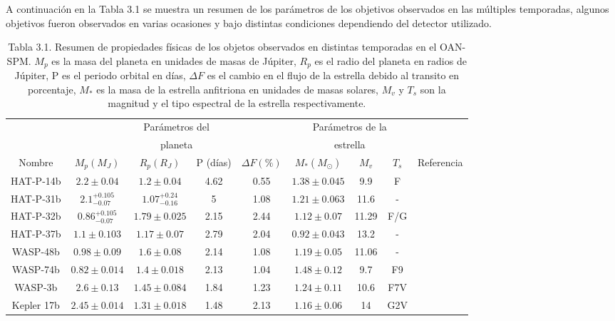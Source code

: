 A continuación en la Tabla 3.1 se muestra un resumen de los parámetros de los objetivos observados en las múltiples temporadas, algunos objetivos fueron observados en varias ocasiones y bajo distintas condiciones dependiendo del detector utilizado.



\begin{table}
\hspace{-1.7cm}
\begin{footnotesize}
\begin{tabular}{ccccccccc}
\hline 
 & \multicolumn{4}{c}{Parámetros del} & \multicolumn{3}{c}{Parámetros de la} &  \\
 & \multicolumn{4}{c}{planeta} & \multicolumn{3}{c}{estrella} & \\
\hline 
Nombre & $M_{p} (M_{J}) $ & $R_{p} (R_{J}) $ &  P (días) & $\Delta F (\%)$ & $M_{*} (M_{\odot})$ & $M_{v}$ & $T_{s}$ & Referencia \\ 
\hline 
HAT-P-14b & $2.2\pm 0.04 $ & $1.2\pm 0.04 $ & 4.62 & 0.55 & $1.38\pm 0.045$ & 9.9 & F & \cite{torres2010hat} \\ 
HAT-P-31b & $2.1^{+0.105}_{-0.07} $ & $1.07^{+0.24}_{-0.16} $ & 5 & 1.08 & $1.21\pm 0.063$ & 11.6 & - & \cite{kipping2011hat} \\
HAT-P-32b & $0.86^{+0.105}_{-0.07} $ & $1.79\pm 0.025 $ & 2.15 & 2.44 & $1.12\pm 0.07$ & 11.29 & F/G & \cite{hartman2011hat} \\  
HAT-P-37b & $1.1\pm 0.103 $ & $1.17\pm 0.07 $ & 2.79 & 2.04 & $0.92\pm 0.043$ & 13.2 & - & \cite{bakos2012hat} \\
WASP-48b & $0.98\pm 0.09 $ & $1.6\pm 0.08 $ & 2.14 & 1.08 & $1.19\pm 0.05$ & 11.06 & - & \cite{enoch2011wasp} \\
WASP-74b & $0.82\pm 0.014 $ & $1.4\pm 0.018 $ & 2.13 & 1.04 & $1.48\pm 0.12$ & 9.7 & F9 & \cite{hellier2015three} \\
WASP-3b & $2.6\pm 0.13 $ & $1.45\pm 0.084 $ & 1.84 & 1.23 & $1.24\pm 0.11$ & 10.6 & F7V & \cite{pollacco2008wasp} \\
Kepler 17b & $2.45\pm 0.014 $ & $1.31\pm 0.018 $ & 1.48 & 2.13 & $1.16\pm 0.06$ & 14 & G2V & \cite{desert2011hot} \\
\hline 
\end{tabular} 
\end{footnotesize}
\caption{Tabla 3.1. Resumen de propiedades físicas de los objetos observados en distintas temporadas en el OAN-SPM. $M_{p}$ es la masa del planeta en unidades de masas de Júpiter, $R_{p}$ es el radio del planeta en radios de Júpiter, P es el periodo orbital en días, $\Delta F$ es el cambio en el flujo de la estrella debido al transito en porcentaje, $M_{*}$ es la masa de la estrella anfitriona en unidades de masas solares, $M_{v}$ y $T_{s}$ son la magnitud y el tipo espectral de la estrella respectivamente.}
\label{tab:tab_objetivos}
\end{table}

